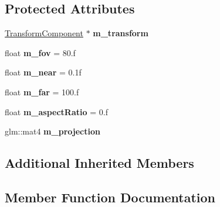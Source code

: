 \subsection*{Protected Attributes}
\begin{DoxyCompactItemize}
\item 
\mbox{\label{classce_1_1game_1_1_camera_component_ab9e91ffab463b69ce6630b81e6cc949d}} 
\hyperlink{classce_1_1game_1_1_transform_component}{Transform\+Component} $\ast$ {\bfseries m\+\_\+transform}
\item 
\mbox{\label{classce_1_1game_1_1_camera_component_a07d30e0bf458272a54be2e41d06ce73e}} 
float {\bfseries m\+\_\+fov} = 80.f
\item 
\mbox{\label{classce_1_1game_1_1_camera_component_a063122e5cfed1be0ddb7efb3047ce28d}} 
float {\bfseries m\+\_\+near} = 0.\+1f
\item 
\mbox{\label{classce_1_1game_1_1_camera_component_a4bc867d12c68cfe99b50e75f774de6b9}} 
float {\bfseries m\+\_\+far} = 100.f
\item 
\mbox{\label{classce_1_1game_1_1_camera_component_aab4b75baa0244460f39d13abae1cbbf5}} 
float {\bfseries m\+\_\+aspect\+Ratio} = 0.f
\item 
\mbox{\label{classce_1_1game_1_1_camera_component_af6c1308a7b8b29f8abf25b7f666037b1}} 
glm\+::mat4 {\bfseries m\+\_\+projection}
\end{DoxyCompactItemize}
\subsection*{Additional Inherited Members}


\subsection{Member Function Documentation}
\mbox{\label{classce_1_1game_1_1_camera_component_a15140bffd017245dd17ed9aa0f953a1b}} 

